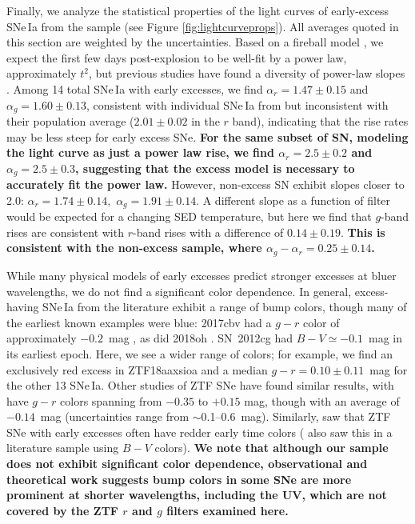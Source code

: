 \documentclass[twocolumn,twocolappendix, linenumbers]{aastex631} %
\begin{document}
\begin{figure}
\end{figure}
Finally, we analyze the statistical properties of the light curves of early-excess SNe\,Ia from the \cite{Yao19} sample (see Figure \ref{fig:lightcurveprops}). All averages quoted in this section are weighted by the uncertainties. Based on a fireball model \citep{Riess99}, we expect the first few days post-explosion to be well-fit by a power law, approximately $t^2$, but previous studies have found a diversity of power-law slopes \citep{Miller20, Fausnaugh21}. Among 14 total SNe\,Ia with early excesses, we find $\alpha_r = 1.47 \pm 0.15$ and $\alpha_g = 1.60 \pm 0.13$, consistent with individual SNe\,Ia from \citet{Miller20} but inconsistent with their population average ($2.01 \pm 0.02$ in the $r$ band), indicating that the rise rates may be less steep for early excess SNe. {\bf For the same subset of SN, modeling the light curve as just a power law rise, we find $\alpha_r = 2.5 \pm 0.2$ and $\alpha_g = 2.5 \pm 0.3$, suggesting that the excess model is necessary to accurately fit the power law.} However, non-excess SN exhibit slopes closer to 2.0: $\alpha_r = 1.74 \pm 0.14,$ $\alpha_g = 1.91 \pm 0.14$. A different slope as a function of filter would be expected for a changing SED temperature, but here we find that 
$g$-band rises are consistent with $r$-band rises with a difference of $0.14 \pm 0.19$. {\bf This is consistent with the non-excess sample, where $\alpha_g - \alpha_r = 0.25 \pm 0.14$.}


While many physical models of early excesses predict stronger excesses at bluer wavelengths, we do not find a significant color dependence. In general, excess-having SNe\,Ia from the literature exhibit a range of bump colors, though many of the earliest known examples were blue: 2017cbv had a $g-r$ color of approximately $-0.2$~mag \citep{Hosseinzadeh17}, as did 2018oh \citep[albeit very uncertain]{Dimitriadis19}.  SN~2012cg had $B-V \simeq -0.1$~mag in its earliest epoch.  Here, we see a wider range of colors; for example, we find an exclusively red excess in ZTF18aaxsioa and a median $g-r = 0.10 \pm 0.11$~mag for the other 13 SNe\,Ia.  Other studies of ZTF SNe have found similar results, with 
\citet{Deckers22} have $g-r$ colors spanning from $-0.35$ to $+0.15$ mag, though with an average of $-0.14$~mag (uncertainties range from $\sim$0.1--0.6~mag).  Similarly, \citet{Burke22b} saw that ZTF SNe with early excesses often have redder early time colors (\citealp{Burke22a} also saw this in a literature sample using $B-V$ colors). {\bf We note that although our sample does not exhibit significant color dependence, observational \citep[e.g.,][]{Hosseinzadeh17} and theoretical \citep[e.g.,][]{Kasen10} work suggests bump colors in some SNe are more prominent at shorter wavelengths, including the UV, which are not covered by the ZTF $r$ and $g$ filters examined here.}
\end{document}
